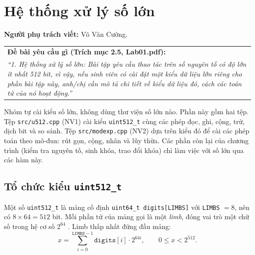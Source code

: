 \section{Hệ thống xử lý số lớn}
\label{sec:so-lon}

\noindent\textbf{Người phụ trách viết:} Võ Văn Cường.

\begin{table}[h!]
\centering
\begin{tabular}{|p{14.5cm}|}
\hline
\textbf{Đề bài yêu cầu gì (Trích mục 2.5, Lab01.pdf):} \\
\textit{``1. Hệ thống xử lý số lớn: Bài tập yêu cầu thao tác trên số nguyên tố có độ lớn ít nhất 512 bit, vì vậy, nếu sinh viên có cài đặt một kiểu dữ liệu lớn riêng cho phần bài tập này, anh/chị cần mô tả chi tiết về kiểu dữ liệu đó, cách các toán tử của nó hoạt động.''} \\
\hline
\end{tabular}
\end{table}


Nhóm tự cài kiểu số lớn, không dùng thư viện số lớn nào. Phần này gồm hai tệp. Tệp \texttt{src/u512.cpp} (NV1) cài kiểu \texttt{uint512\_t} cùng các phép đọc, ghi, cộng, trừ, dịch bit và so sánh. Tệp \texttt{src/modexp.cpp} (NV2) dựa trên kiểu đó để cài các phép toán theo mô-đun: rút gọn, cộng, nhân và lũy thừa. Các phần còn lại của chương trình (kiểm tra nguyên tố, sinh khóa, trao đổi khóa) chỉ làm việc với số lớn qua các hàm này.

\subsection{Tổ chức kiểu \texttt{uint512\_t}}

Một số \texttt{uint512\_t} là mảng cố định \texttt{uint64\_t digits[LIMBS]} với \texttt{LIMBS} $= 8$, nên có $8 \times 64 = 512$ bit. Mỗi phần tử của mảng gọi là một \emph{limb}, đóng vai trò một chữ số trong hệ cơ số $2^{64}$ \cite{knuth1997art}. Limb thấp nhất đứng đầu mảng:
\begin{equation}
x = \sum_{i=0}^{\texttt{LIMBS}-1} \texttt{digits}[i] \cdot 2^{64 i}, \qquad 0 \le x < 2^{512}.
\end{equation}

